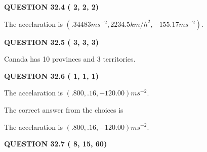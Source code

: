 \documentclass[12pt]{article}
\begin{document}
  
 
 
 
 
  
\vspace{0.2in}
  
{\textbf{\Large{QUESTION
32.4 
 (          2,          2,          2)
}}}
  
  
 
 
\noindent{}
 
 
The accelaration is
$(
.34483ms^{-2},
2234.5km/h^2,
-155.17ms^{-2}
).
$
 
 
 
 
  
\vspace{0.2in}
  
{\textbf{\Large{QUESTION
32.5 
 (          3,          3,          3)
}}}
  
  
 
 
\noindent{}
 
 
Canada has  %
10 provinces and  %
3 territories.
 
 
 
 
  
\vspace{0.2in}
  
{\textbf{\Large{QUESTION
32.6 
 (          1,          1,          1)
}}}
  
  


 
 
\noindent{}
 
 
The accelaration is $  %
(
.800,
.16,
-120.00)
ms^{-2} $.
 
 
 
 
 
 
\noindent{}

The correct answer from the choices is


The accelaration is $  %
(
.800,
.16,
-120.00)
ms^{-2} $.
 
 
 
  
\vspace{0.2in}
  
{\textbf{\Large{QUESTION
32.7 
 (          8,         15,         60)
}}}
  
\end{document}
